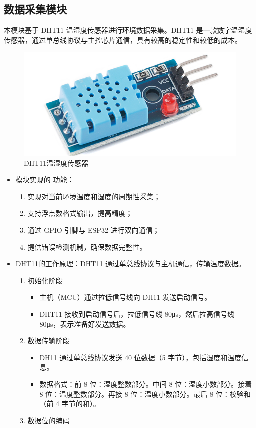 \documentclass[UTF8]{ctexart}
\begin{document}
\subsection{数据采集模块}
本模块基于 DHT11 温湿度传感器进行环境数据采集。DHT11 是一款数字温湿度传感器，通过单总线协议与主控芯片通信，具有较高的稳定性和较低的成本。
	\begin{figure}[htbp]
	\centering
	\includegraphics[width=0.3\linewidth]{figure/2}
	\caption{DHT11温湿度传感器} %
	\label{fig:image1} %
\end{figure}
\begin{itemize}
	\item 模块实现的	功能：
	\begin{enumerate}
		\item 实现对当前环境温度和湿度的周期性采集；
		\item 支持浮点数格式输出，提高精度；
		\item 通过 GPIO 引脚与 ESP32 进行双向通信；
		\item 提供错误检测机制，确保数据完整性。
	\end{enumerate}
	\item DHT11的工作原理：DHT11 通过单总线协议与主机通信，传输温度数据。
	
	\begin{enumerate}
		\item 初始化阶段
			\begin{itemize}
				\item 主机（MCU）通过拉低信号线向 DH11 发送启动信号。
				\item DHT11 接收到启动信号后，拉低信号线 80μs，然后拉高信号线 80μs，表示准备好发送数据。
			\end{itemize}
		\item 数据传输阶段
		\begin{itemize}
			\item DH11 通过单总线协议发送 40 位数据（5 字节），包括湿度和温度信息。
			\item 数据格式：前 8 位：湿度整数部分。中间 8 位：湿度小数部分。接着 8 位：温度整数部分。再接 8 位：温度小数部分。最后 8 位：校验和（前 4 字节的和）。
		\end{itemize}
		\item 数据位的编码\par
		

\end{enumerate}
\end{itemize}
\end{document}

